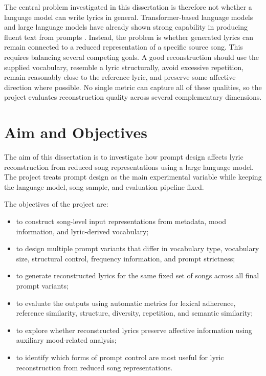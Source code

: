 The central problem investigated in this dissertation is therefore not whether a language model can write lyrics in general. Transformer-based language models and large language models have already shown strong capability in producing fluent text from prompts \cite{vaswani2017attention,brown2020language}. Instead, the problem is whether generated lyrics can remain connected to a reduced representation of a specific source song. This requires balancing several competing goals. A good reconstruction should use the supplied vocabulary, resemble a lyric structurally, avoid excessive repetition, remain reasonably close to the reference lyric, and preserve some affective direction where possible. No single metric can capture all of these qualities, so the project evaluates reconstruction quality across several complementary dimensions.

\section{Aim and Objectives}

The aim of this dissertation is to investigate how prompt design affects lyric reconstruction from reduced song representations using a large language model. The project treats prompt design as the main experimental variable while keeping the language model, song sample, and evaluation pipeline fixed.

The objectives of the project are:

\begin{itemize}
    \item to construct song-level input representations from metadata, mood information, and lyric-derived vocabulary;
    \item to design multiple prompt variants that differ in vocabulary type, vocabulary size, structural control, frequency information, and prompt strictness;
    \item to generate reconstructed lyrics for the same fixed set of songs across all final prompt variants;
    \item to evaluate the outputs using automatic metrics for lexical adherence, reference similarity, structure, diversity, repetition, and semantic similarity;
    \item to explore whether reconstructed lyrics preserve affective information using auxiliary mood-related analysis;
    \item to identify which forms of prompt control are most useful for lyric reconstruction from reduced song representations.
\end{itemize}

